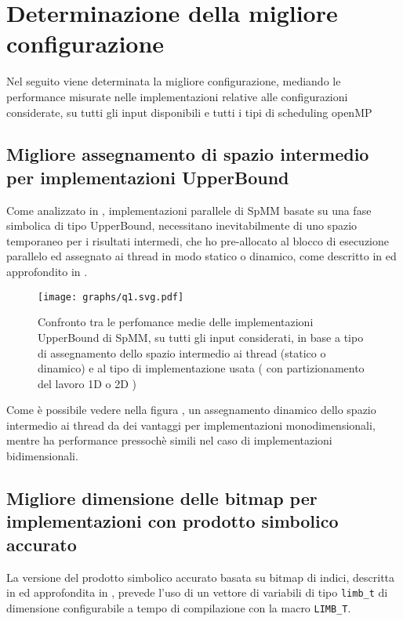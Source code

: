 \section{Determinazione della migliore configurazione}	\label{bestConf}
Nel seguito viene determinata la migliore configurazione, mediando le performance misurate nelle implementazioni relative alle configurazioni considerate,
su tutti gli input disponibili e tutti i tipi di scheduling openMP

\subsection[Migliore assegnamento di spazio intermedio per\\implementazioni UpperBound]
{Migliore assegnamento di spazio intermedio per implementazioni UpperBound}
Come analizzato in , implementazioni parallele di SpMM basate su una fase simbolica di tipo UpperBound,
necessitano inevitabilmente di uno spazio temporaneo per i risultati intermedi, 
che ho pre-allocato al blocco di esecuzione parallelo 
ed assegnato ai thread in modo statico o dinamico, 
come descritto in  ed approfondito in .\\

\begin{figure}[H]
  \centering \texttt{[image: graphs/q1.svg.pdf]}
  \caption[UB: confronto assegnamento spazio temporaneo]
  {Confronto tra le perfomance medie delle implementazioni UpperBound di SpMM, su tutti gli input considerati, in base a
		tipo di assegnamento dello spazio intermedio ai thread (statico o dinamico) e al tipo di implementazione usata 
		( con partizionamento del lavoro 1D o 2D ) }
  \decoRule \label{fig:q1}
\end{figure}

Come è possibile vedere nella figura , un assegnamento dinamico dello spazio intermedio ai thread da dei vantaggi
per implementazioni monodimensionali, mentre ha performance pressochè simili nel caso di implementazioni bidimensionali.\\

\subsection[Migliore dimensione bitmap nel prodotto simbolico accurato]
{Migliore dimensione delle bitmap per implementazioni con prodotto simbolico accurato}
La versione del prodotto simbolico accurato basata su bitmap di indici, descritta in  
ed approfondita in , prevede l'uso di un vettore di variabili di tipo \verb|limb_t|
di dimensione configurabile a tempo di compilazione con la macro \verb|LIMB_T|.\\

